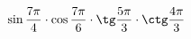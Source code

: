\begin{ex}[type=calculate]
	\begin{condition}
		\( \sin\dfrac{7\pi}{4}\cdot\cos\dfrac{7\pi}{6}\cdot\tg\dfrac{5\pi}{3}\cdot\ctg\dfrac{4\pi}{3} \)
	\end{condition}
\end{ex}